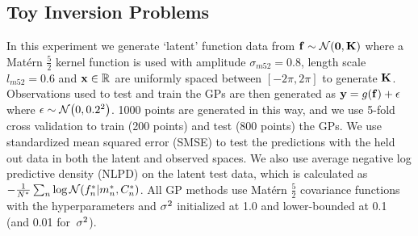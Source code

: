 \documentclass{article} %
\begin{document}
\subsection{Toy Inversion Problems}
\label{sec:exptoy}
%
In this experiment %
we generate `latent' function data
from $\mathbf{f} \sim \mathcal{N}\!\left({\mathbf{0}, \mathbf{K}}\right)$ where a Mat\'ern $\frac{5}{2}$
kernel function is used with amplitude $\sigma_{m52} = 0.8$, length scale
$l_{m52} = 0.6$ and $\mathbf{x} \in \mathbb{R}^{}$ are uniformly spaced between $[-2\pi,
2\pi]$ to generate $\mathbf{K}$. Observations used to test and train the GPs are
then generated as $\mathbf{y} = g\!\left({{\mathbf{f}}}\right) + \epsilon$ where $\epsilon \sim
\mathcal{N}\!\left({0, 0.2^2}\right)$. 1000 points are generated in this way, and we use 5-fold
cross validation to train (200 points) and test (800 points) the GPs. We use
standardized mean squared error (SMSE) to test the predictions with the held
out data in both the latent and observed spaces. We also use  average
negative log predictive density (NLPD) on the latent test data, which is
calculated as $-\frac{1}{N^{*}} \sum_{n} \log
\mathcal{N}\!\left({f_n^{*}}\middle\vert{\ensuremath{m}_n\ensuremath{^{*}}, \ensuremath{C}_n\ensuremath{^{*}}}\right)$. All  GP methods use
Mat\'ern $\frac{5}{2}$ covariance functions with the hyperparameters and
$\sigma^2$ initialized at 1.0 and lower-bounded at 0.1 (and 0.01 for~$\sigma^2$).
%
\end{document}
